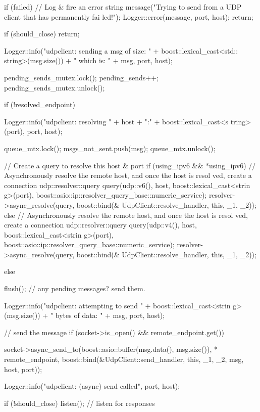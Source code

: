 \begin{DoxyCode}
{
    if (failed)
    {
        // Log & fire an error
        string message("Trying to send from a UDP client that has permanently fai
      led!");
        Logger::error(message, port, host);
        return;
    }

    if (should_close)
        return;

    Logger::info("udpclient: sending a msg of size: " + boost::lexical_cast<std::
      string>(msg.size()) + " which is: " + msg, port, host);

    pending_sends_mutex.lock();
    pending_sends++;
    pending_sends_mutex.unlock();

    if (!resolved_endpoint)
    {
        Logger::info("udpclient: resolving " + host + ":" + boost::lexical_cast<s
      tring>(port), port, host);

        queue_mtx.lock();
        msgs_not_sent.push(msg);
        queue_mtx.unlock();

        // Create a query to resolve this host & port
        if (using_ipv6 && *using_ipv6)
        {
            // Asynchronously resolve the remote host, and once the host is resol
      ved, create a connection
            udp::resolver::query query(udp::v6(), host, boost::lexical_cast<strin
      g>(port),
                    boost::asio::ip::resolver_query_base::numeric_service);
            resolver->async_resolve(query, boost::bind(&
      UdpClient::resolve_handler, this, _1, _2));
        }
        else
        {
            // Asynchronously resolve the remote host, and once the host is resol
      ved, create a connection
            udp::resolver::query query(udp::v4(), host, boost::lexical_cast<strin
      g>(port),
                    boost::asio::ip::resolver_query_base::numeric_service);
            resolver->async_resolve(query, boost::bind(&
      UdpClient::resolve_handler, this, _1, _2));
        }
    }
    else
    {
        flush(); // any pending messages? send them.

        Logger::info("udpclient: attempting to send " + boost::lexical_cast<strin
      g>(msg.size()) + " bytes of data: " + msg, port, host);

        // send the message
        if (socket->is_open() && remote_endpoint.get())
        {
            socket->async_send_to(boost::asio::buffer(msg.data(), msg.size()), *
      remote_endpoint,
                    boost::bind(&UdpClient::send_handler, this, _1, _2, msg, 
      host, port));

            Logger::info("udpclient: (async) send called", port, host);

            if (!should_close)
                listen(); // listen for responses
        }
    }
}
\end{DoxyCode}
